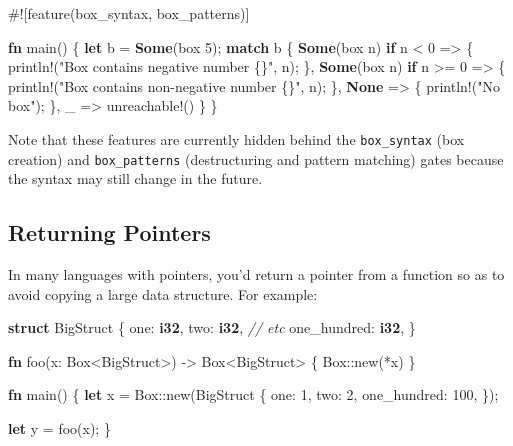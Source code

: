 \documentclass[a4paper,]{book}
\newenvironment{Shaded}{\begin{snugshade}}{\end{snugshade}}
\newcommand{\KeywordTok}[1]{\textcolor[rgb]{0.13,0.29,0.53}{\textbf{{#1}}}}
\newcommand{\DecValTok}[1]{\textcolor[rgb]{0.00,0.00,0.81}{{#1}}}
\newcommand{\StringTok}[1]{\textcolor[rgb]{0.31,0.60,0.02}{{#1}}}
\newcommand{\CommentTok}[1]{\textcolor[rgb]{0.56,0.35,0.01}{\textit{{#1}}}}
\newcommand{\OtherTok}[1]{\textcolor[rgb]{0.56,0.35,0.01}{{#1}}}
\newcommand{\NormalTok}[1]{{#1}}
\begin{document}
\begin{Shaded}
\begin{Highlighting}[]
\NormalTok{#![feature(box_syntax, box_patterns)]}

\KeywordTok{fn} \NormalTok{main() \{}
    \KeywordTok{let} \NormalTok{b = }\KeywordTok{Some}\NormalTok{(box }\DecValTok{5}\NormalTok{);}
    \KeywordTok{match} \NormalTok{b \{}
        \KeywordTok{Some}\NormalTok{(box n) }\KeywordTok{if} \NormalTok{n < }\DecValTok{0} \NormalTok{=> \{}
            \OtherTok{println!}\NormalTok{(}\StringTok{"Box contains negative number \{\}"}\NormalTok{, n);}
        \NormalTok{\},}
        \KeywordTok{Some}\NormalTok{(box n) }\KeywordTok{if} \NormalTok{n >= }\DecValTok{0} \NormalTok{=> \{}
            \OtherTok{println!}\NormalTok{(}\StringTok{"Box contains non-negative number \{\}"}\NormalTok{, n);}
        \NormalTok{\},}
        \KeywordTok{None} \NormalTok{=> \{}
            \OtherTok{println!}\NormalTok{(}\StringTok{"No box"}\NormalTok{);}
        \NormalTok{\},}
        \NormalTok{_ => }\OtherTok{unreachable!}\NormalTok{()}
    \NormalTok{\}}
\NormalTok{\}}
\end{Highlighting}
\end{Shaded}

Note that these features are currently hidden behind the
\texttt{box\_syntax} (box creation) and \texttt{box\_patterns}
(destructuring and pattern matching) gates because the syntax may still
change in the future.

\subsection{Returning Pointers}\label{returning-pointers}

In many languages with pointers, you'd return a pointer from a function
so as to avoid copying a large data structure. For example:

\begin{Shaded}
\begin{Highlighting}[]
\KeywordTok{struct} \NormalTok{BigStruct \{}
    \NormalTok{one: }\KeywordTok{i32}\NormalTok{,}
    \NormalTok{two: }\KeywordTok{i32}\NormalTok{,}
    \CommentTok{// etc}
    \NormalTok{one_hundred: }\KeywordTok{i32}\NormalTok{,}
\NormalTok{\}}

\KeywordTok{fn} \NormalTok{foo(x: Box<BigStruct>) -> Box<BigStruct> \{}
    \NormalTok{Box::new(*x)}
\NormalTok{\}}

\KeywordTok{fn} \NormalTok{main() \{}
    \KeywordTok{let} \NormalTok{x = Box::new(BigStruct \{}
        \NormalTok{one: }\DecValTok{1}\NormalTok{,}
        \NormalTok{two: }\DecValTok{2}\NormalTok{,}
        \NormalTok{one_hundred: }\DecValTok{100}\NormalTok{,}
    \NormalTok{\});}

    \KeywordTok{let} \NormalTok{y = foo(x);}
\NormalTok{\}}
\end{Highlighting}
\end{Shaded}
\end{document}
